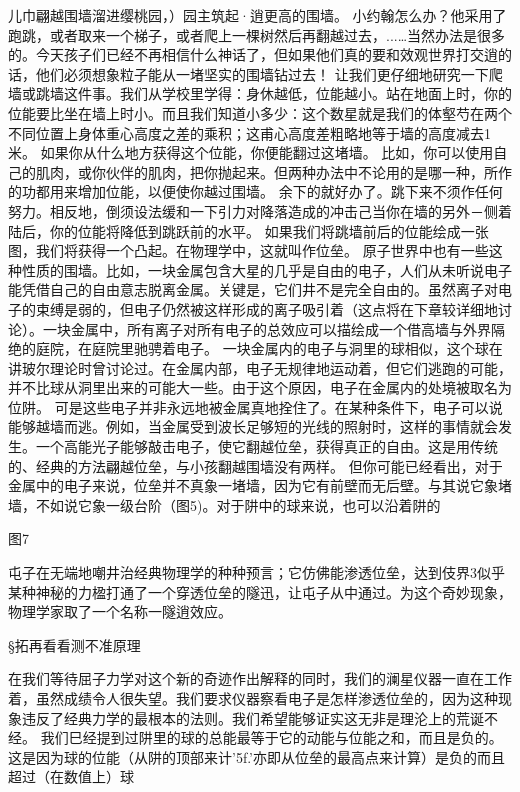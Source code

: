 儿巾翩越围墙溜进缨桃园，）园主筑起·逍更高的围墙。
小约翰怎么办？他采用了跑跳，或者取来一个梯子，或者爬上一棵树然后再翻越过去，...…当然办法是很多的。今天孩子们已经不再相信什么神话了，但如果他们真的要和效观世界打交逍的话，他们必须想象粒子能从一堵坚实的围墙钻过去！
让我们更仔细地研究一下爬墙或跳墙这件事。我们从学校里学得：身休越低，位能越小。站在地面上时，你的位能要比坐在墙上时小。而且我们知道小多少：这个数星就是我们的体壑芍在两个不同位置上身体重心高度之差的乘积；这甫心高度差粗略地等于墙的高度减去1米。
如果你从什么地方获得这个位能，你便能翻过这堵墙。
比如，你可以使用自己的肌肉，或你伙伴的肌肉，把你抛起来。但两种办法中不论用的是哪一种，所作的功都用来增加位能，以便使你越过围墙。
余下的就好办了。跳下来不须作任何努力。相反地，倒须设法缓和一下引力对降落造成的冲击己当你在墙的另外－侧着陆后，你的位能将降低到跳跃前的水平。
如果我们将跳墙前后的位能绘成一张图，我们将获得一个凸起。在物理学中，这就叫作位垒。
原子世界中也有一些这种性质的围墙。比如，一块金属包含大星的几乎是自由的电子，人们从未听说电子能凭借自己的自由意志脱离金属。关键是，它们井不是完全自由的。虽然离子对电子的束缚是弱的，但电子仍然被这样形成的离子吸引着（这点将在下章较详细地讨论）。一块金属中，所有离子对所有电子的总效应可以描绘成一个借高墙与外界隔绝的庭院，在庭院里驰骋着电子。
一块金属内的电子与洞里的球相似，这个球在讲玻尔理论时曾讨论过。在金属内部，电子无规律地运动着，但它们逃跑的可能，并不比球从洞里出来的可能大一些。由于这个原因，电子在金属内的处境被取名为位阱。
可是这些电子并非永远地被金属真地拴住了。在某种条件下，电子可以说能够越墙而逃。例如，当金属受到波长足够短的光线的照射时，这样的事情就会发生。一个高能光子能够敲击电子，使它翻越位垒，获得真正的自由。这是用传统的、经典的方法翩越位垒，与小孩翻越围墙没有两样。
但你可能已经看出，对于金属中的电子来说，位垒并不真象一堵墙，因为它有前壁而无后壁。与其说它象堵墙，不如说它象一级台阶（图5)。对于阱中的球来说，也可以沿着阱的



图7

屯子在无端地嘲井治经典物理学的种种预言；它仿佛能渗透位垒，达到伎界3似乎某种神秘的力楹打通了一个穿透位垒的隧迅，让屯子从中通过。为这个奇妙现象，物理学家取了一个名称一隧逍效应。

§拓再看看测不准原理

在我们等待屈子力学对这个新的奇迹作出解释的同时，我们的澜星仪器一直在工作着，虽然成绩令人很失望。我们要求仪器察看电子是怎样渗透位垒的，因为这种现象违反了经典力学的最根本的法则。我们希望能够证实这无非是理沦上的荒诞不经。
我们巳经提到过阱里的球的总能最等于它的动能与位能之和，而且是负的。这是因为球的位能（从阱的顶部来计'5f.'亦即从位垒的最高点来计算）是负的而且超过（在数值上）球

